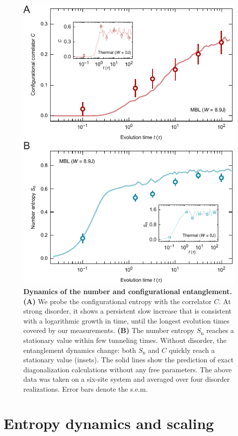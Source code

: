 \begin{figure}[t!]
	\centering
	\includegraphics{figures/MBL_entropy_dynamics.pdf}
	\caption{{\bf Dynamics of the number and configurational entanglement. } {\bf (A)} We probe the configurational entropy with the correlator $C$. At strong disorder, it shows a persistent slow increase that is consistent with a logarithmic growth in time, until the longest evolution times covered by our measurements. {\bf (B)} The number entropy $S_\text{n}$ reaches a stationary value within few tunneling times. Without disorder, the entanglement dynamics change: both $S_\text{n}$ and $C$ quickly reach a stationary value (insets). The solid lines show the prediction of exact diagonalization calculations without any free parameters. The above data was taken on a six-site system and averaged over four disorder realizations. Error bars denote the s.e.m.}\label{fig:MBL_entropy_dynamics}
\end{figure}

\section{Entropy dynamics and scaling}

